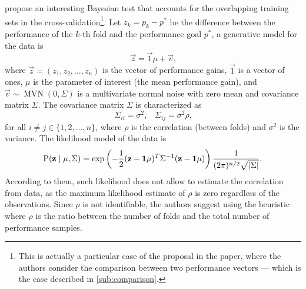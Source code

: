 \textcite{Benavoli2017} propose an interesting Bayesian test that accounts for the
overlapping training sets in the cross-validation\footnote{%
This is actually a particular case of the proposal in the paper, where the authors
consider the comparison between two performance vectors --- which is the case described in
\cref{sub:comparison}.}.
Let $z_k = p_k - p^{*}$ be the
difference between the performance of the $k$-th fold and the performance goal $p^{*}$,
a generative model for the data is
\begin{equation*}
  \vec{z} = \vec{1}\mu + \vec{v}\text{,}
\end{equation*}
where $\vec{z} = (z_1, z_2, \ldots, z_n)$ is the vector of performance gains, $\vec{1}$ is a
vector of ones, $\mu$ is the parameter of interest (the mean performance gain), and
$\vec{v} \sim \operatorname{MVN}(0, \Sigma)$ is a multivariate normal noise with zero mean
and covariance matrix $\Sigma$.  The covariance matrix $\Sigma$ is characterized as
\begin{equation*}
  \Sigma_{ii} = \sigma^2\text{,}\quad
  \Sigma_{ij} = \sigma^2\rho\text{,}
\end{equation*}
for all $i \neq j \in \{1, 2, \ldots, n\}$, where $\rho$ is the correlation (between folds)
and $\sigma^2$ is the variance.  The likelihood model of the data is
\begin{equation*}
  \operatorname{P}(\mathbf{z} \mid \mu, \Sigma) =
    \exp\left(-\frac{1}{2}(\mathbf{z} - \mathbf{1}\mu)^T \Sigma^{-1} (\mathbf{z} - \mathbf{1}\mu)\right)
    \frac{1}{(2\pi)^{n/2} \sqrt{\lvert \Sigma \rvert}}\text{.}
\end{equation*}
According to them, such likelihood does not allow to estimate the correlation from data,
as the maximum likelihood estimate of $\rho$ is zero regardless of the observations.
Since $\rho$ is not identifiable, the authors suggest using the heuristic where $\rho$ is
the ratio between the number of folds and the total number of performance samples.

